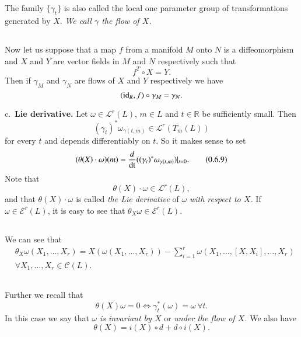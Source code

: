 \setcounter{subsection}{6}
\subsection{}\label{chap0:0.6.7}

The family $\{\gamma_{t}\}$ is also called the local one parameter
group of transformations generated by $X$. {\em We call $\gamma$ the
flow of $X$.}

\subsection{}\label{chap0:0.6.8}
Now let us suppose that a map $f$ from a manifold $M$ onto $N$ is a
diffeomorphism and $X$ and $Y$ are vector fields in $M$ and $N$
respectively such that
$$
f^{T}\circ X=Y.
$$
Then if $\gamma_{M}$ and $\gamma_{N}$ are flows of $X$ and $Y$
respectively we have
$$
(\operatorname{id}_{R},f)\circ \gamma_{M}=\gamma_{N}.
$$

\qquad c.~{\bf Lie derivative.} Let $\omega\in \mathscr{L}^{r}(L)$,
$m\in L$ and $t\in \mathbb{R}$ be sufficiently small. Then 
$$
(\gamma_{t})^{\ast}\omega_{\gamma(t,m)}\in \mathscr{L}^{r}(T_{m}(L))
$$
for every $t$ and depends differentiably on $t$. So it makes sense to
set
\begin{equation*}
(\theta(X)\cdot\omega)(m)=\frac{d}{\operatorname{dt}}((\gamma_{t})^{\ast}\omega_{\gamma(t,m)})|_{t=0}.\tag{0.6.9}\label{chap0:0.6.9} 
\end{equation*}
Note \pageoriginale that
$$
\theta(X) \cdot \omega\in \mathscr{L}^{r}(L),
$$
and that $\theta(X) \cdot \omega$ is called {\em the Lie derivative}
of 
$\omega$ {\em with respect to $X$.} If $\omega\in \mathscr{E}^{r}(L)$,
it is easy to see that $\theta_{X}\omega\in \mathscr{E}^{r}(L)$.

\setcounter{subsection}{9}
\subsection{}\label{chap0:0.6.10}

We can see that
\begin{align*}
& \theta_{X}\omega(X_{1},\ldots,X_{r})=X(\omega(X_{1},\ldots,X_{r}))-\sum^{r}_{i=1}\omega(X_{1},\ldots,[X,X_{i}],\ldots,
X_{r})\\
&\forall X_{1},\ldots,X_{r}\in\mathscr{C}(L).
\end{align*}

\subsection{}\label{chap0:0.6.11}

Further we recall that
$$
\theta(X)\omega=0\Leftrightarrow \gamma^{\ast}_{t}(\omega)=\omega\,\forall t. 
$$
In this case we say that $\omega$ {\em is invariant by $X$} or {\em
under the flow of $X$.} We also have
\begin{equation*}
\theta(X)=i(X)\circ d+d\circ i(X).\tag{0.6.12}\label{chap0:0.6.12}
\end{equation*}


